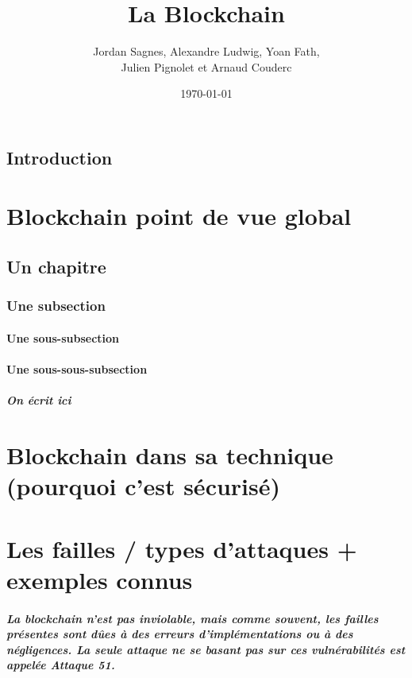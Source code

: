 \documentclass[12pt, a4paper, oneside]{book}
\title{La Blockchain}
\author{ Jordan Sagnes, Alexandre Ludwig, Yoan Fath, \\ Julien Pignolet et Arnaud Couderc}
\date{\today}
\begin{document}
 
\maketitle
 
    \frontmatter
    \section{Introduction}
 
    \mainmatter
 
    \chapter{Blockchain point de vue global}
    \section{Un chapitre}
    \subsection{Une subsection}
    \subsubsection{Une sous-subsection}
    \subsubsection{Une sous-sous-subsection}
    \paragraph{On écrit ici}

    \chapter{Blockchain dans sa technique (pourquoi c'est sécurisé)}

    \chapter{Les failles / types d'attaques + exemples connus}
    \paragraph{La blockchain n'est pas inviolable, mais comme souvent, les failles présentes sont dûes à des erreurs d'implémentations ou à des négligences. La seule attaque ne se basant pas sur ces vulnérabilités est appelée \emph{Attaque 51}.}
\end{document}
